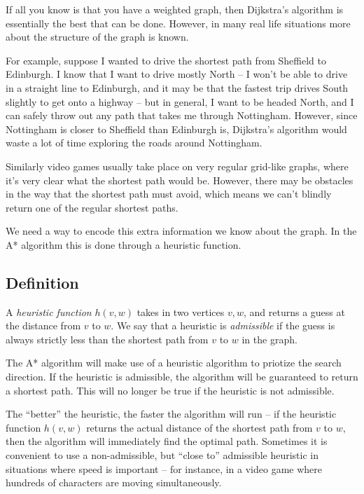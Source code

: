 \documentclass[]{article}
\begin{document}
If all you know is that you have a weighted graph, then Dijkstra's
algorithm is essentially the best that can be done. However, in many
real life situations more about the structure of the graph is known.

For example, suppose I wanted to drive the shortest path from Sheffield
to Edinburgh. I know that I want to drive mostly North -- I won't be
able to drive in a straight line to Edinburgh, and it may be that the
fastest trip drives South slightly to get onto a highway -- but in
general, I want to be headed North, and I can safely throw out any path
that takes me through Nottingham. However, since Nottingham is closer to
Sheffield than Edinburgh is, Dijkstra's algorithm would waste a lot of
time exploring the roads around Nottingham.

Similarly video games usually take place on very regular grid-like
graphs, where it's very clear what the shortest path would be. However,
there may be obstacles in the way that the shortest path must avoid,
which means we can't blindly return one of the regular shortest paths.

We need a way to encode this extra information we know about the graph.
In the A* algorithm this is done through a heuristic function.

\subsection{Definition}\label{definition-8}

A \emph{heuristic function} \(h(v,w)\) takes in two vertices \(v, w\),
and returns a guess at the distance from \(v\) to \(w\). We say that a
heuristic is \emph{admissible} if the guess is always strictly less than
the shortest path from \(v\) to \(w\) in the graph.

The A* algorithm will make use of a heuristic algorithm to priotize the
search direction. If the heuristic is admissible, the algorithm will be
guaranteed to return a shortest path. This will no longer be true if the
heuristic is not admissible.

The ``better'' the heuristic, the faster the algorithm will run -- if
the heuristic function \(h(v,w)\) returns the actual distance of the
shortest path from \(v\) to \(w\), then the algorithm will immediately
find the optimal path. Sometimes it is convenient to use a
non-admissible, but ``close to'' admissible heuristic in situations
where speed is important -- for instance, in a video game where hundreds
of characters are moving simultaneously.
\end{document}
